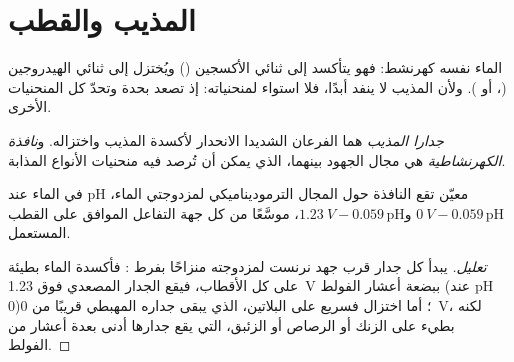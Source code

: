 \section{المذيب والقطب}

الماء نفسه كهرنشط: فهو يتأكسد إلى ثنائي الأكسجين
() ويُختزل إلى ثنائي الهيدروجين (، أو
). ولأن المذيب لا ينفد أبدًا، فلا استواء
لمنحنياته: إذ تصعد بحدة وتحدّ كل المنحنيات الأخرى.

\begin{definition}\label{def:b2:current-potential-curves:window}
\emph{جدارا المذيب} هما الفرعان الشديدا الانحدار
لأكسدة المذيب واختزاله. و\emph{نافذة
الكهرنشاطية} هي مجال الجهود بينهما،
الذي يمكن أن تُرصد فيه منحنيات الأنواع المذابة.
\end{definition}

\begin{proposition}\label{prop:b2:current-potential-curves:window}
في الماء عند pH معيّن تقع النافذة حول المجال الترموديناميكي
لمزدوجتي الماء، $\qty{0}{V} - 0.059\,\mathrm{pH}$ و$\qty{1.23}{V} -
0.059\,\mathrm{pH}$، موسَّعًا من كل جهة 
التفاعل الموافق على القطب المستعمل.
\end{proposition}

\begin{proof}[تعليل]
يبدأ كل جدار قرب جهد نرنست لمزدوجته منزاحًا بفرط
: فأكسدة الماء بطيئة على كل الأقطاب، فيقع
الجدار المصعدي فوق \qty{1.23}{V} ببضعة أعشار الفولط (عند pH 0)؛ أما
اختزال  فسريع على البلاتين، الذي يبقى جداره المهبطي قريبًا من
\qty{0}{V}، لكنه بطيء على الزنك أو الرصاص أو الزئبق، التي يقع جدارها أدنى
بعدة أعشار من الفولط.
\end{proof}

